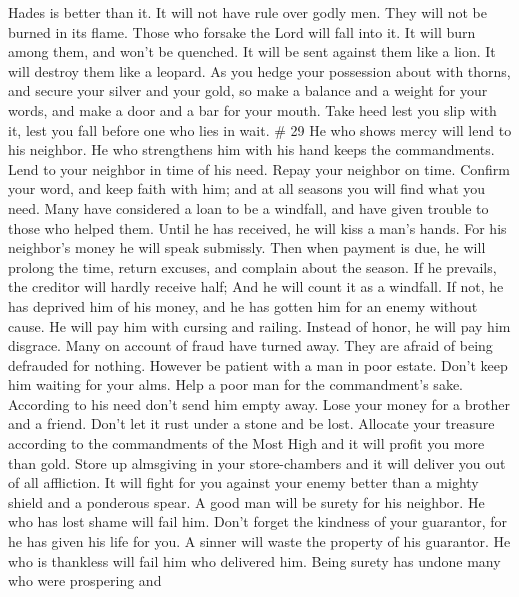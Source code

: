 Hades is better than it.  It will not have rule over godly
men. They will not be burned in its flame.  Those who
forsake the Lord will fall into it. It will burn among them, and won't
be quenched. It will be sent against them like a lion. It will destroy
them like a leopard.  As you hedge your possession about
with thorns, and secure your silver and your gold,  so make
a balance and a weight for your words, and make a door and a bar for
your mouth.  Take heed lest you slip with it, lest you fall
before one who lies in wait. \# 29  He who shows mercy will
lend to his neighbor. He who strengthens him with his hand keeps the
commandments.  Lend to your neighbor in time of his need.
Repay your neighbor on time.  Confirm your word, and keep
faith with him; and at all seasons you will find what you need.
 Many have considered a loan to be a windfall, and have
given trouble to those who helped them.  Until he has
received, he will kiss a man's hands. For his neighbor's money he will
speak submissly. Then when payment is due, he will prolong the time,
return excuses, and complain about the season.  If he
prevails, the creditor will hardly receive half; And he will count it as
a windfall. If not, he has deprived him of his money, and he has gotten
him for an enemy without cause. He will pay him with cursing and
railing. Instead of honor, he will pay him disgrace.  Many
on account of fraud have turned away. They are afraid of being defrauded
for nothing.  However be patient with a man in poor estate.
Don't keep him waiting for your alms.  Help a poor man for
the commandment's sake. According to his need don't send him empty away.
 Lose your money for a brother and a friend. Don't let it
rust under a stone and be lost.  Allocate your treasure
according to the commandments of the Most High and it will profit you
more than gold.  Store up almsgiving in your store-chambers
and it will deliver you out of all affliction.  It will
fight for you against your enemy better than a mighty shield and a
ponderous spear.  A good man will be surety for his
neighbor. He who has lost shame will fail him.  Don't
forget the kindness of your guarantor, for he has given his life for
you.  A sinner will waste the property of his guarantor.
 He who is thankless will fail him who delivered him.
 Being surety has undone many who were prospering and
